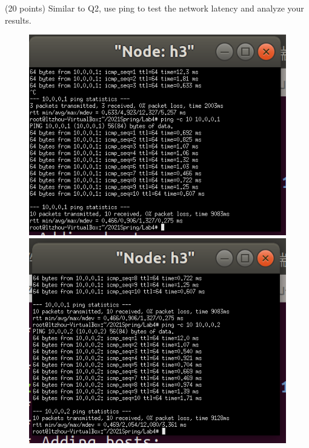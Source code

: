 \begin{exercise}[]{(20 points) Similar to Q2, use ping to test the network latency and analyze your results.}
\begin{solution}
    \begin{figure}[ht]
        \begin{center}
        \begin{minipage}[t]{0.3\linewidth}
            \centering
            \includegraphics[width=0.9\linewidth]{img/lab4/ex3-2.png}
        \end{minipage}
        \begin{minipage}[t]{0.3\linewidth}
            \centering
            \includegraphics[width=0.9\linewidth]{img/lab4/ex3-3.png}
        \end{minipage}
        \begin{minipage}[t]{0.3\linewidth}
            \centering

\end{minipage}
\end{center}
\end{figure}
\end{solution}
\end{exercise}
